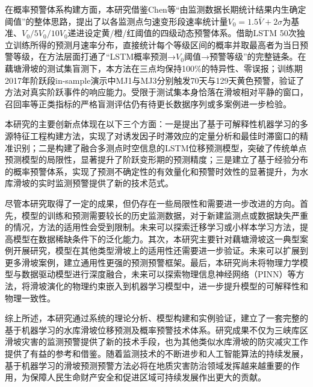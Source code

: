 \documentclass[12pt,a4paper]{article}
\begin{document}
在概率预警体系构建方面，本研究借鉴Chen等\cite{chen2024statistical}“由监测数据长期统计结果内生确定阈值”的整体思路，提出了以各监测点匀速变形段速率统计量$V_0 = 1.5\bar V + 2\sigma$为基准、$V_0/5V_0/10V_0$递进设定黄/橙/红阈值的四级动态预警体系。借助LSTM 50次独立训练所得的预测月速率分布，直接统计每个等级区间的概率并取最高者为当日预警等级，在方法层面打通了“LSTM概率预测→$V_0$阈值→预警等级”的完整链条。在藕塘滑坡的测试集盲测下，本方法在三点均保持100\%的特异性、零误报；训练期2017年阶跃段in-sample演示中MJ1与MJ3分别触发70天与129天黄色预警，验证了方法对真实阶跃事件的响应能力。受限于测试集本身恰落在滑坡相对平静的窗口，召回率等正类指标的严格盲测评估仍有待更长数据序列或多案例进一步检验。

本研究的主要创新点体现在以下三个方面：一是提出了基于可解释性机器学习的多源特征工程构建方法，实现了对诱发因子时滞效应的定量分析和最佳时滞窗口的精准识别；二是构建了融合多测点时空信息的LSTM位移预测模型，突破了传统单点预测模型的局限性，显著提升了阶跃变形期的预测精度；三是建立了基于经验分布的概率预警体系，实现了预测不确定性的有效量化和预警时效性的显著提升，为水库滑坡的实时监测预警提供了新的技术范式。

尽管本研究取得了一定的成果，但仍存在一些局限性和需要进一步改进的方向。首先，模型的训练和预测需要较长的历史监测数据，对于新建监测点或数据缺失严重的情况，方法的适用性会受到限制。未来可以探索迁移学习或小样本学习方法，提高模型在数据稀缺条件下的泛化能力。其次，本研究主要针对藕塘滑坡这一典型案例开展研究，模型在其他类型滑坡上的适用性还需要进一步验证。未来可以扩展到更多滑坡案例，建立通用性更强的预测预警框架。最后，本研究尚未将物理力学模型与数据驱动模型进行深度融合，未来可以探索物理信息神经网络（PINN）等方法，将滑坡演化的物理约束嵌入到机器学习模型中，进一步提升模型的可解释性和物理一致性。

综上所述，本研究通过系统的理论分析、模型构建和实例验证，建立了一套完整的基于机器学习的水库滑坡位移预测及概率预警技术体系。研究成果不仅为三峡库区滑坡灾害的监测预警提供了新的技术手段，也为其他类似水库滑坡的防灾减灾工作提供了有益的参考和借鉴。随着监测技术的不断进步和人工智能算法的持续发展，基于机器学习的滑坡预测预警方法必将在地质灾害防治领域发挥越来越重要的作用，为保障人民生命财产安全和促进区域可持续发展作出更大的贡献。
\end{document}
